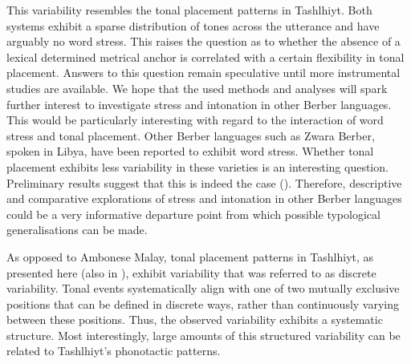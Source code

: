 This variability resembles the tonal placement patterns in Tashlhiyt. Both systems exhibit a sparse distribution of tones across the utterance and have arguably no word stress. This raises the question as to whether the absence of a lexical determined metrical anchor is correlated with a certain flexibility in tonal placement. Answers to this question remain speculative until more instrumental studies are available. We hope that the used methods and analyses will spark further interest to investigate stress and intonation in other Berber languages. This would be particularly interesting with regard to the interaction of word stress and tonal placement. Other Berber languages such as Zwara Berber, spoken in Libya, have been reported to exhibit word stress. Whether tonal placement exhibits less variability in these varieties is an interesting question. Preliminary results suggest that this is indeed the case (\citealt{Gussenhoven.accepted}). Therefore, descriptive and comparative explorations of stress and intonation in other Berber languages could be a very informative departure point from which possible typological generalisations can be made. 

As opposed to Ambonese Malay, tonal placement patterns in Tashlhiyt, as presented here (also in \citealt{Grice.etal2015tash}), exhibit variability that was referred to as discrete variability. Tonal events systematically align with one of two mutually exclusive positions that can be defined in discrete ways, rather than continuously varying between these positions. Thus, the observed variability exhibits a systematic structure. Most interestingly, large amounts of this structured variability can be related to Tashlhiyt’s phonotactic patterns. 

